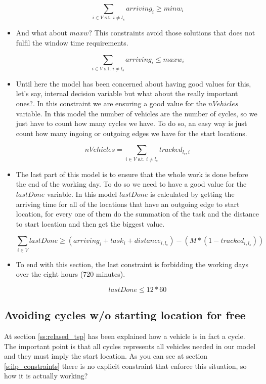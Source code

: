 \documentclass[]{report}
\begin{document}
\begin{itemize}
	$$\sum\limits_{i \in V \text{ s.t. } i \neq l_{s}} arriving_{i} \geq minw_{i}$$
	
	\item And what about $maxw$? This constraints avoid those solutions that does not fulfil the window time requirements.
	
	$$\sum\limits_{i \in V \text{ s.t. } i \neq l_{s}} arriving_{i} \leq maxw_{i}$$
	
	\item Until here the model has been concerned about having good values for this, let's say, internal decision variable but what about the really important ones?. In this constraint we are ensuring a good value for the $nVehicles$ variable. In this model the number of vehicles are the number of cycles, so we just have to count how many cycles we have. To do so, an easy way is just count how many ingoing or outgoing edges we have for the start locations.
	
	$$nVehicles = \sum\limits_{i \in V \text{ s.t. } i \neq l_{s}} tracked_{l_{s}, i}$$
	
	\item The last part of this model is to ensure that the whole work is done before the end of the working day. To do so we need to have a good value for the $lastDone$ variable. In this model $lastDone$ is calculated by getting the arriving time for all of the locations that have an outgoing edge to start location, for every one of them do the summation of the task and the distance to start location and then get the biggest value.
	
	$$ \sum\limits_{i \in V} lastDone \geq (arriving_i + task_i + distance_{i, l_{s}}) - (M*(1-tracked_{i, l_{s}}))$$
	
	\item To end with this section, the last constraint is forbidding the working days over the eight hours (720 minutes).
	
	$$ lastDone \leq 12*60$$


\end{itemize}

\subsection{Avoiding cycles w/o starting location for free}\label{ss:arriving_time_0_implications}

At section \ref{ss:relased_tsp} has been explained how a vehicle is in fact a cycle. The important point is that all cycles represents all vehicles needed in our model and they must imply the start location. As you can see at section \ref{s:ilp_constraints} there is no explicit constraint that enforce this situation, so how it is actually  working?
\end{document}

